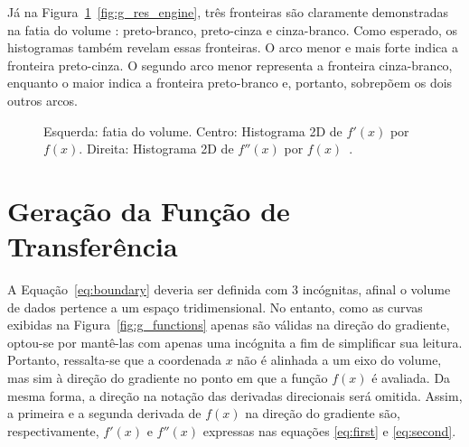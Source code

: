 	Já na Figura~\ref{fig:g_res}~\ref{fig:g_res_engine}, três fronteiras são claramente demonstradas na fatia do volume : preto-branco, preto-cinza e cinza-branco. Como esperado, os histogramas também revelam essas fronteiras. O arco menor e mais forte indica a fronteira preto-cinza. O segundo arco menor representa a fronteira cinza-branco, enquanto o maior indica a fronteira preto-branco e, portanto, sobrepõem os dois outros arcos.
	
\begin{figure}[h]
	\centering
	\caption{Esquerda: fatia do volume. Centro: Histograma 2D de $ f'(x) $ por $ f(x) $. Direita: Histograma 2D de $ f''(x) $ por $ f(x) $~\cite{gordon}.}
	\label{fig:g_res}
\end{figure}

\clearpage    
\section{Geração da Função de Transferência}
\label{sec:gordon.ft}
	A Equação~\eqref{eq:boundary} deveria ser definida com 3 incógnitas, afinal o volume de dados pertence a um espaço tridimensional. No entanto, como as curvas exibidas na Figura~\ref{fig:g_functions} apenas são válidas na direção do gradiente, optou-se por mantê-las com apenas uma incógnita a fim de simplificar sua leitura. Portanto, ressalta-se que a coordenada $x$ não é alinhada a um eixo do volume, mas sim à direção do gradiente no ponto em que a função $f(x)$ é avaliada. Da mesma forma, a direção na notação das derivadas direcionais será omitida. Assim, a primeira e a segunda derivada de $f(x)$ na direção do gradiente são, respectivamente, $f'(x)$ e $f''(x)$ expressas nas equações \eqref{eq:first} e \eqref{eq:second}.
	\\
	
